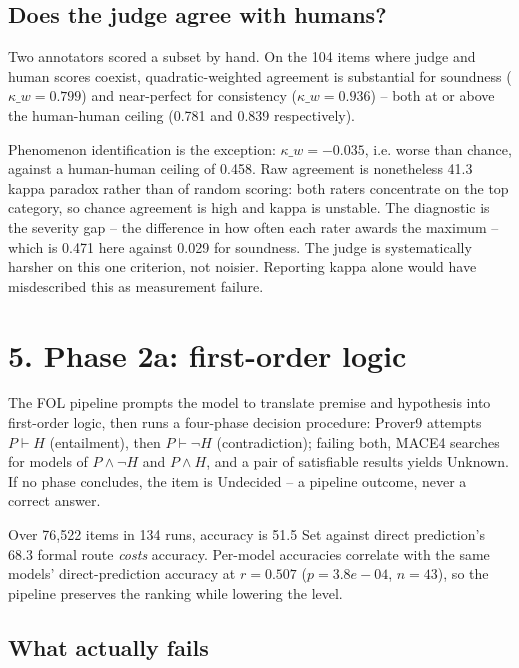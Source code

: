 \documentclass[11pt]{article}
\begin{document}
\subsection{Does the judge agree with humans?}

Two annotators scored a subset by hand. On the 104
items where judge and human scores coexist, quadratic-weighted agreement is
substantial for soundness ($\kappa\_w=0.799$)
and near-perfect for consistency
($\kappa\_w=0.936$) -- both at or above
the human-human ceiling (0.781 and
0.839 respectively).

Phenomenon identification is the exception:
$\kappa\_w=-0.035$, i.e. worse than
chance, against a human-human ceiling of
0.458. Raw agreement is nonetheless
41.3%
kappa paradox rather than of random scoring: both raters concentrate on the
top category, so chance agreement is high and kappa is unstable. The
diagnostic is the severity gap -- the difference in how often each rater
awards the maximum -- which is 0.471 here
against 0.029 for soundness. The judge is
systematically harsher on this one criterion, not noisier. Reporting kappa
alone would have misdescribed this as measurement failure.

\section{5. Phase 2a: first-order logic}

The FOL pipeline prompts the model to translate premise and hypothesis
into first-order logic, then runs a four-phase decision procedure:
Prover9 attempts $P \vdash H$ (entailment), then $P \vdash \neg H$
(contradiction); failing both, MACE4 searches for models of $P \wedge
\neg H$ and $P \wedge H$, and a pair of satisfiable results yields
Unknown. If no phase concludes, the item is Undecided -- a pipeline
outcome, never a correct answer.

Over 76,522 items in 134 runs, accuracy is
51.5%
Set against direct prediction's 68.3%
formal route \emph{costs} accuracy. Per-model accuracies correlate with the
same models' direct-prediction accuracy at
$r=0.507$
($p=3.8e-04$, $n=43$), so the
pipeline preserves the ranking while lowering the level.

\subsection{What actually fails}
\end{document}
